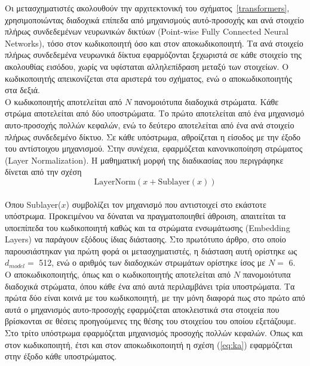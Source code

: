 \documentclass[12pt]{article}
\numberwithin{equation}{section}
\begin{document}
Οι μετασχηματιστές ακολουθούν την αρχιτεκτονική του σχήματος~\ref{transformers}, χρησιμοποιώντας διαδοχικά επίπεδα από μηχανισμούς αυτό-προσοχής και  ανά στοιχείο πλήρως συνδεδεμένων νευρωνικών δικτύων (Point-wise Fully Connected Neural Networks), τόσο στον κωδικοποιητή όσο και στον αποκωδικοποιητή. Τα ανά στοιχείο πλήρως συνδεδεμένα νευρωνικά δίκτυα εφαρμόζονται ξεχωριστά σε κάθε στοιχείο της ακολουθίας εισόδου, χωρίς να υφίσταται αλληλεπίδραση μεταξύ των στοιχείων. Ο κωδικοποιητής απεικονίζεται στα αριστερά του σχήματος, ενώ ο αποκωδικοποιητής στα δεξιά. \\

Ο κωδικοποιητής αποτελείται από \(N\) πανομοιότυπα διαδοχικά στρώματα. Κάθε στρώμα αποτελείται από δύο υποστρώματα. Το πρώτο αποτελείται από ένα μηχανισμό αυτο-προσοχής πολλών κεφαλών, ενώ το δεύτερο αποτελείται από ένα ανά στοιχείο πλήρως συνδεδεμένο δίκτυο. Σε κάθε υπόστρωμα, αθροίζεται η είσοδος με την έξοδο του αντίστοιχου μηχανισμού. Στην συνέχεια, εφαρμόζεται κανονικοποίηση στρώματος (Layer Normalization). Η μαθηματική μορφή της διαδικασίας που περιγράφηκε δίνεται από την σχέση  \\

\begin{equation}
\text{LayerNorm}(x + \text{Sublayer}(x))
\label{eq:ka}
\end{equation}\\

\noindent Όπου Sublayer(\(x\)) συμβολίζει τον μηχανισμό που αντιστοιχεί στο εκάστοτε υπόστρωμα. Προκειμένου να δύναται να πραγματοποιηθεί άθροιση, απαιτείται τα υποεπίπεδα του κωδικοποιητή καθώς και τα στρώματα ενσωμάτωσης (Embedding Layers) να παράγουν εξόδους ίδιας διάστασης. Στο πρωτότυπο άρθρο, στο οποίο παρουσιάστηκαν για πρώτη φορά οι μετασχηματιστές, η διάσταση αυτή ορίστηκε ως \(d_{model} =\) 512, ενώ ο αριθμός των διαδοχικών στρωμάτων ορίστηκε ίσος με \(N =\) 6.\\

Ο αποκωδικοποιητής, όπως και ο κωδικοποιητής αποτελείται από \(N\) πανομοιότυπα διαδοχικά στρώματα, όπου κάθε ένα από αυτά περιλαμβάνει τρία υποστρώματα. Τα πρώτα δύο είναι κοινά με του κωδικοποιητή, με την μόνη διαφορά πως στο πρώτο από αυτά ο μηχανισμός αυτο-προσοχής εφαρμόζεται αποκλειστικά στα στοιχεία που βρίσκονται σε θέσεις προηγούμενες της θέσης του στοιχείου του οποίου εξετάζουμε. Στο τρίτο υπόστρωμα εφαρμόζεται μηχανισμός προσοχής πολλών κεφαλών. Όπως και στον κωδικοποιητή, έτσι και στον αποκωδικοποιητή η σχέση (\ref{eq:ka}) εφαρμόζεται στην έξοδο κάθε υποστρώματος.  \\
\end{document}
